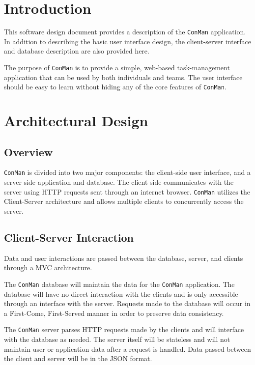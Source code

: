 \documentclass{article}
\begin{document}

\normalsize

\newpage
\tableofcontents

\newpage
\section{Introduction}
This software design document provides a description of the \texttt{ConMan} application.  In addition to describing the basic user interface design, the client-server interface and database description are also provided here.

The purpose of \texttt{ConMan} is to provide a simple, web-based task-management application that can be used by both individuals and teams.
The user interface should be easy to learn without hiding any of the core features of \texttt{ConMan}.

\newpage
\section{Architectural Design}
\subsection{Overview}
\texttt{ConMan} is divided into two major components: the client-side user interface, and a server-side application and database.
The client-side communicates with the server using HTTP requests sent through an internet browser.  
\texttt{ConMan} utilizes the Client-Server architecture and allows multiple clients to concurrently access the server.  

\subsection{Client-Server Interaction}
Data and user interactions are passed between the database, server, and clients through a MVC architecture.

The \texttt{ConMan} database will maintain the data for the \texttt{ConMan} application.  
The database will have no direct interaction with the clients and is only accessible through an interface with the server.
Requests made to the database will occur in a First-Come, First-Served manner in order to preserve data consistency.

The \texttt{ConMan} server parses HTTP requests made by the clients and will interface with the database as needed.  
The server itself will be stateless and will not maintain user or application data after a request is handled.
Data passed between the client and server will be in the JSON format.
\end{document}
